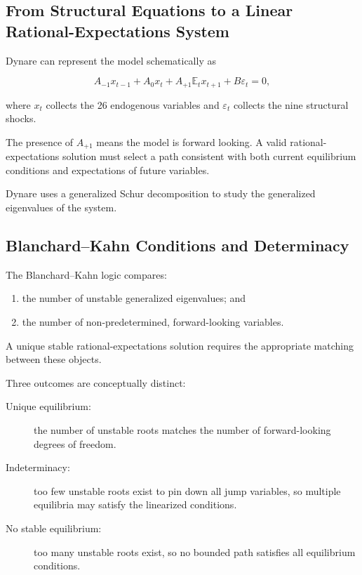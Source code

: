 \subsection{From Structural Equations to a Linear Rational-Expectations System}
\label{app:linear_system}

Dynare can represent the model schematically as

\begin{equation}
A_{-1}x_{t-1}
+
A_0x_t
+
A_{+1}\mathbb E_tx_{t+1}
+
B\varepsilon_t
=
0,
\label{eq:lre_system}
\end{equation}

where \(x_t\) collects the 26 endogenous variables and \(\varepsilon_t\)
collects the nine structural shocks.

The presence of \(A_{+1}\) means the model is forward looking. A valid
rational-expectations solution must select a path consistent with both current
equilibrium conditions and expectations of future variables.

Dynare uses a generalized Schur decomposition to study the generalized
eigenvalues of the system.

\subsection{Blanchard--Kahn Conditions and Determinacy}
\label{app:bk}

The Blanchard--Kahn logic compares:

\begin{enumerate}
    \item the number of unstable generalized eigenvalues; and
    \item the number of non-predetermined, forward-looking variables.
\end{enumerate}

A unique stable rational-expectations solution requires the appropriate
matching between these objects.

Three outcomes are conceptually distinct:

\begin{description}
    \item[Unique equilibrium:] the number of unstable roots matches the number
    of forward-looking degrees of freedom.
    \item[Indeterminacy:] too few unstable roots exist to pin down all jump
    variables, so multiple equilibria may satisfy the linearized conditions.
    \item[No stable equilibrium:] too many unstable roots exist, so no bounded
    path satisfies all equilibrium conditions.
\end{description}

